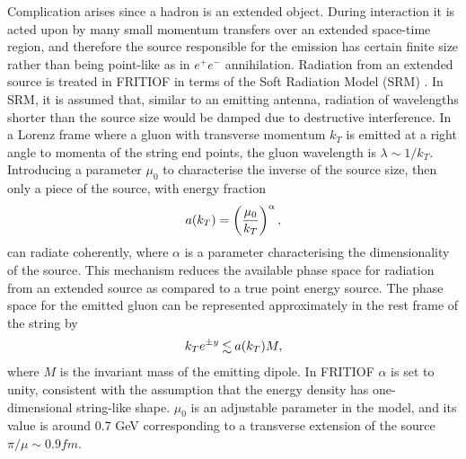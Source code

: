 Complication arises since a hadron is an extended object. During interaction
it is acted upon by many small momentum transfers over an extended space-time
region, and therefore the source responsible for the emission has certain finite
size rather than being point-like as in $e^+e^-$ annihilation.  
Radiation from an extended source is treated in FRITIOF in terms of
the Soft Radiation Model (SRM) \cite{exten}.  In SRM, it is assumed that,     
similar to an emitting antenna, radiation of wavelengths shorter than the
source size would be damped due to destructive interference.  In a Lorenz
frame where a gluon with transverse momentum $k_T$ is emitted at a right
angle to momenta of the string end points, the gluon wavelength is $\lambda\sim 1/k_T$.  Introducing
a parameter $\mu_0$ to characterise the inverse of the source size, then only
a piece of the source, with energy fraction
\begin{equation}
\label{akt}
a(k_T) = \left({\mu_0\over k_T}\right)^\alpha,
\end{equation}
can radiate coherently, where $\alpha$ is a parameter characterising the
dimensionality of the source.  This mechanism \cite{exten} reduces the available phase space for radiation from an extended source as compared to a true point energy source.   The phase space for the emitted gluon can be
represented approximately in the rest frame of the string by
\begin{equation}
\label{akt1}
k_T e^{\pm y} \lsim a(k_T) M, 
\end{equation}
where $M$ is the invariant mass of the emitting dipole.   
In FRITIOF $\alpha$ is set to unity, consistent with the
assumption that the energy density has one-dimensional string-like shape.
$\mu_0$ is an adjustable parameter in the model, and its value is around 
0.7 GeV corresponding to a transverse extension of the source
$\pi/\mu\sim 0.9 fm$.  

